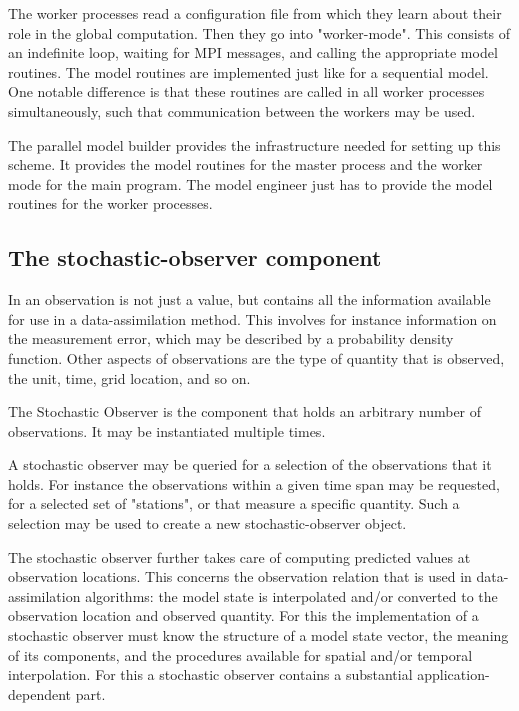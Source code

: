 The worker processes read a configuration file from which they learn about their role in the global computation. Then they go into "worker-mode". This consists of an indefinite loop, waiting for MPI messages, and calling the appropriate model routines. The model routines are implemented just like for a sequential model. One notable difference is that these routines are called in all worker processes simultaneously, such that communication between the workers may be used.

The parallel model builder provides the infrastructure needed for setting up this scheme. It provides the model routines for the master process and the worker mode for the \oda main program. The model engineer just has to provide the model routines for the worker processes.

\subsection{The \oda stochastic-observer component}

In \oda an observation is not just a value, but contains all the information available for use in a data-assimilation method. This involves for instance information on the measurement error, which may be described by a probability density function. Other aspects of observations are the type of quantity that is observed, the unit, time, grid location, and so on.

The Stochastic Observer is the \oda component that holds an arbitrary number of observations. It may be instantiated multiple times.

A stochastic observer may be queried for a selection of the observations that it holds. For instance the observations within a given time span may be requested, for a selected set of "stations", or that measure a specific quantity. Such a selection may be used to create a new stochastic-observer object.

The stochastic observer further takes care of computing predicted values at observation locations. This concerns the observation relation that is used in data-assimilation algorithms: the model state is interpolated and/or converted to the observation location and observed quantity. For this the implementation of a stochastic observer must know the structure of a model state vector, the meaning of its components, and the procedures available for spatial and/or temporal interpolation. For this a stochastic observer contains a substantial application-dependent part.

